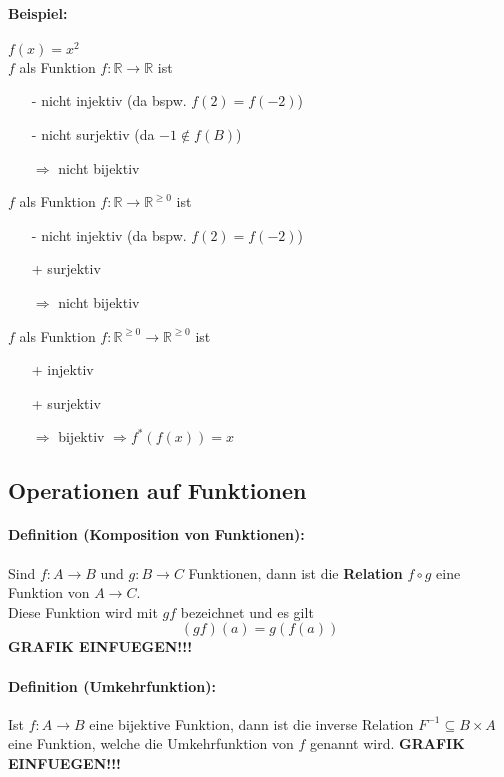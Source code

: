 \documentclass[10pt,a4paper]{article}
\begin{document}
\paragraph{Beispiel:}$f(x)=x^2$\\
$f$ als Funktion $f:\mathbb{R}\rightarrow\mathbb{R}$ ist
\begin{itemize}
\item[-] nicht injektiv (da bspw. $f(2)=f(-2)$)
\item[-] nicht surjektiv (da $-1\notin f(B)$)
\item[$\Rightarrow$] nicht bijektiv
\end{itemize}
$f$ als Funktion $f:\mathbb{R}\rightarrow\mathbb{R}^{\geq 0}$ ist
\begin{itemize}
\item[-] nicht injektiv (da bspw. $f(2)=f(-2)$)
\item[+] surjektiv
\item[$\Rightarrow$] nicht bijektiv
\end{itemize}
$f$ als Funktion $f:\mathbb{R}^{\geq 0}\rightarrow\mathbb{R}^{\geq 0}$ ist
\begin{itemize}
\item[+] injektiv
\item[+] surjektiv
\item[$\Rightarrow$] bijektiv $\Rightarrow f^{*}(f(x))=x$
\end{itemize}

\subsection{Operationen auf Funktionen}
\paragraph{Definition (Komposition von Funktionen):}Sind $f:A\rightarrow B$ und $g:B\rightarrow C$ Funktionen, dann ist die \textbf{Relation} $f\circ g$ eine Funktion von $A\rightarrow C$.\\
Diese Funktion wird mit $gf$ bezeichnet und es gilt
\[
(gf)(a)=g(f(a))
\]
\textbf{GRAFIK EINFUEGEN!!!}
\paragraph{Definition (Umkehrfunktion):}Ist $f:A\rightarrow B$ eine bijektive Funktion, dann ist die inverse Relation $F^{-1}\subseteq B\times A$ eine Funktion, welche die Umkehrfunktion von $f$ genannt wird.
\textbf{GRAFIK EINFUEGEN!!!}
\end{document}
